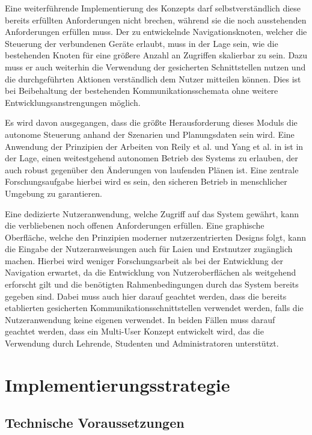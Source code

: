 \newpage
Eine weiterführende Implementierung des Konzepts darf selbstverständlich diese bereits erfüllten Anforderungen nicht brechen, während sie die noch ausstehenden Anforderungen erfüllen muss. Der zu entwickelnde Navigationsknoten, welcher die Steuerung der verbundenen Geräte erlaubt, muss in der Lage sein, wie die bestehenden Knoten für eine größere Anzahl an Zugriffen skalierbar zu sein. Dazu muss er auch weiterhin die Verwendung der gesicherten Schnittstellen nutzen und die durchgeführten Aktionen verständlich dem Nutzer mitteilen können. Dies ist bei Beibehaltung der bestehenden Kommunikationsschemata ohne weitere Entwicklungsanstrengungen möglich. 

Es wird davon ausgegangen, dass die größte Herausforderung dieses Moduls die autonome Steuerung anhand der Szenarien und Planungsdaten sein wird. Eine Anwendung der Prinzipien der Arbeiten von Reily et al. \cite{silentSwarm} und Yang et al. in \cite{2DPlan} ist in der Lage, einen weitestgehend autonomen Betrieb des Systems zu erlauben, der auch robust gegenüber den Änderungen von laufenden Plänen ist. Eine zentrale Forschungsaufgabe hierbei wird es sein, den sicheren Betrieb in menschlicher Umgebung zu garantieren.

Eine dedizierte Nutzeranwendung, welche Zugriff auf das System gewährt, kann die verbliebenen noch offenen Anforderungen erfüllen. Eine graphische Oberfläche, welche den Prinzipien moderner nutzerzentrierten Designs folgt, kann die Eingabe der Nutzeranweisungen auch für Laien und Erstnutzer zugänglich machen. Hierbei wird weniger Forschungsarbeit als bei der Entwicklung der Navigation erwartet, da die Entwicklung von Nutzeroberflächen als weitgehend erforscht gilt und die benötigten Rahmenbedingungen durch das System bereits gegeben sind. Dabei muss auch hier darauf geachtet werden, dass die bereits etablierten gesicherten Kommunikationsschnittstellen verwendet werden, falls die Nutzeranwendung keine eigenen verwendet. In beiden Fällen muss darauf geachtet werden, dass ein Multi-User Konzept entwickelt wird, das die Verwendung durch Lehrende, Studenten und Administratoren unterstützt.


\newpage  \section{Implementierungsstrategie}

\subsection{Technische Voraussetzungen}

